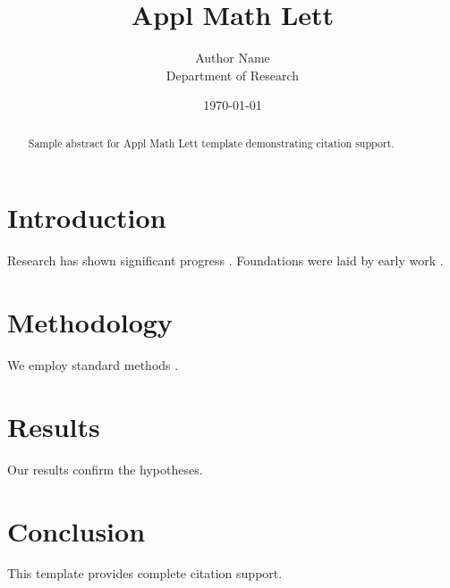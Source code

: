 ﻿\documentclass{elsarticle}
\title{Appl Math Lett}
\author{Author Name \\ \small Department of Research}
\date{\today}
\begin{document}
\maketitle

\begin{abstract}
Sample abstract for Appl Math Lett template demonstrating citation support.
\end{abstract}

\section{Introduction}
Research has shown significant progress \citep{einstein1905}. Foundations were laid by early work \citep{turing1950}.

\section{Methodology}
We employ standard methods \citep{knuth1984}.

\section{Results}
Our results confirm the hypotheses.

\section{Conclusion}
This template provides complete citation support.



\end{document}
